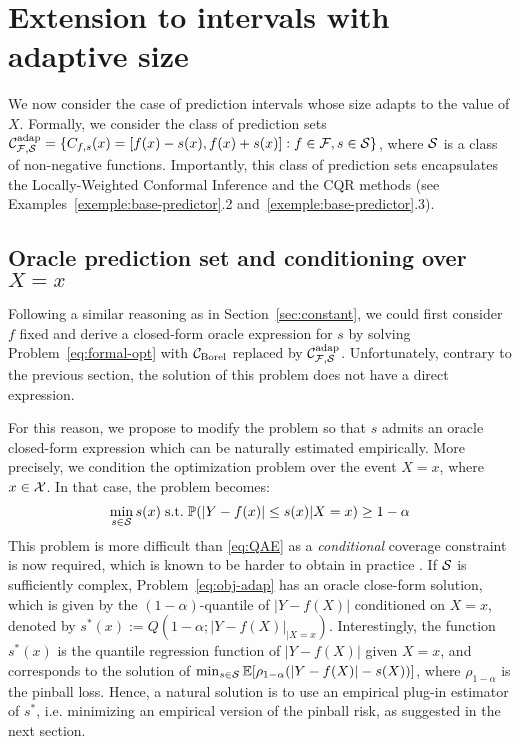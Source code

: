 \section{Extension to intervals with adaptive size}
\label{sec:adaptive}

We now consider the case of prediction intervals whose size adapts to the value of $X$. Formally, we consider the class of prediction sets ${\cal C}^{\text{adap}}_{\mathcal{F},{\cal S}} = \{C_{f,s}(x) = [f(x)-s(x), f(x)+s(x)] : f \in \mathcal{F}, s\in{\cal S}\}$, where ${\cal S}$ is a class of non-negative functions. Importantly, this class of prediction sets encapsulates the Locally-Weighted Conformal Inference and the CQR methods (see Examples~\ref{exemple:base-predictor}.2 and~\ref{exemple:base-predictor}.3).

\subsection{Oracle prediction set and conditioning over $X=x$}

\label{sec:adap-oracle}

Following a similar reasoning as in Section~\ref{sec:constant}, we could first consider $f$ fixed and derive a closed-form oracle expression for $s$ by solving Problem~\eqref{eq:formal-opt} with ${\cal C}_{\text{Borel}}$ replaced by ${\cal C}^{\text{adap}}_{\mathcal{F},{\cal S}}$. %
Unfortunately, contrary to the previous section, the solution of this problem does not have a direct expression.

For this reason, we propose to modify the problem so that $s$ admits an oracle closed-form expression which can be naturally estimated empirically. More precisely,
we condition the optimization problem over the event $X=x$, where $x\in{\cal X}$. In that case, the problem becomes:
\begin{equation}
    \label{eq:obj-adap}
    \min_{s \in {\cal S}}  s(x) \hspace{0.1cm} \text{s.t.} \hspace{0.1cm}  {\mathbb{P}}(|Y-f(x)|\leq s(x)|X=x) \geq 1-\alpha 
\end{equation}
This problem is more difficult than \eqref{eq:QAE} as a \emph{conditional} coverage constraint is now required, which is known to be harder to obtain in practice \citep{vovk2012conditional, lei2014distribution}. If ${\cal S}$ is sufficiently complex, Problem~\eqref{eq:obj-adap} has an oracle close-form solution, which is given by the $(1-\alpha)$-quantile of $|Y-f(X)|$ conditioned on $X=x$, denoted by $s^*(x) := Q(1-\alpha;|Y-f(X)|_{|X=x})$. Interestingly, the function $s^*(x)$ is the quantile regression function of $|Y-f(X)|$ given $X=x$, and corresponds to the solution of $\min_{s\in{\cal S}}\mathbb{E}[\rho_{1-\alpha}(|Y-f(X)| - s(X))]$, where $\rho_{1-\alpha}$ is the pinball loss. Hence, a natural solution is to use an empirical plug-in estimator of $s^*$, i.e. minimizing an empirical version of the pinball risk, as suggested in the next section.

